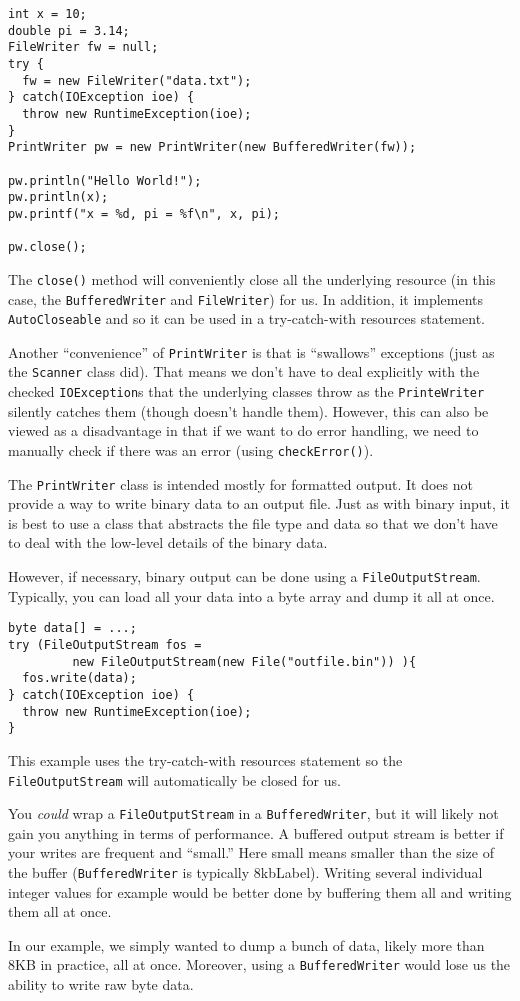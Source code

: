 \begin{verbatim}
int x = 10;
double pi = 3.14;
FileWriter fw = null;
try {
  fw = new FileWriter("data.txt");
} catch(IOException ioe) {
  throw new RuntimeException(ioe);
}
PrintWriter pw = new PrintWriter(new BufferedWriter(fw));

pw.println("Hello World!");
pw.println(x);
pw.printf("x = %d, pi = %f\n", x, pi);

pw.close();
\end{verbatim}

The \texttt{close()} method will conveniently
close all the underlying resource (in this case, the 
\texttt{BufferedWriter} and \texttt{FileWriter}) 
for us.  In addition, 
it implements \texttt{AutoCloseable} and so it can
be used in a try-catch-with resources statement.

Another ``convenience'' of \texttt{PrintWriter} is
that is ``swallows'' exceptions (just as the \texttt{Scanner}
class did).  That means we don't have to deal explicitly with
the checked \texttt{IOException}s that the
underlying classes throw as the \texttt{PrinteWriter}
silently catches them (though doesn't handle them).  However, 
this can also be viewed as a disadvantage in that if we want
to do error handling, we need to manually check if there was 
an error (using \texttt{checkError()}).

The \texttt{PrintWriter} class is intended mostly
for formatted output.  It does not provide a way to write
binary data to an output file.  Just as with binary input, 
it is best to use a class that abstracts the file type and
data so that we don't have to deal with the low-level details
of the binary data.

However, if necessary, binary output can be done using a
\texttt{FileOutputStream}.  Typically, you can
load all your data into a byte array and dump it all at
once.

\begin{verbatim}
byte data[] = ...;
try (FileOutputStream fos = 
         new FileOutputStream(new File("outfile.bin")) ){
  fos.write(data);
} catch(IOException ioe) {
  throw new RuntimeException(ioe);
}
\end{verbatim}

This example uses the try-catch-with resources statement
so the \texttt{FileOutputStream} will automatically
be closed for us.

You \emph{could} wrap a \texttt{FileOutputStream} in a \texttt{BufferedWriter}, but it
will likely not gain you anything in terms of performance.  A
buffered output stream is better if your writes are 
frequent and ``small.'' Here small means smaller than
the size of the buffer (\texttt{BufferedWriter}
is typically 8\gls{kbLabel}).  Writing several individual
integer values for example would be better done by buffering
them all and writing them all at once.  

In our example, we simply wanted to dump a bunch of data, 
likely more than 8KB in practice, all at once.  Moreover, 
using a \texttt{BufferedWriter} would lose us the
ability to write raw byte data.


